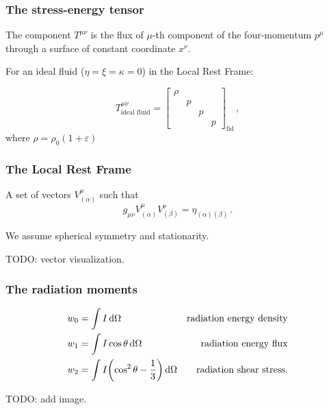 \documentclass{beamer}
\begin{document}
\begin{frame}
    \frametitle{The stress-energy tensor}

    The component \(T^{\mu\nu}\) is the flux of \(\mu\)-th component of the four-momentum \(p^\mu\) through a surface of constant coordinate \(x^\nu\).

    For an ideal fluid (\(\eta = \xi = \kappa = 0\)) in the Local Rest Frame:

    \begin{equation*}
        T^{\mu\nu}_{\text{ideal fluid}} =
        \begin{bmatrix}
        \rho   &   &   &  \\
           & p  &   &  \\
           &   & p  &  \\
           &   &   & p
       \end{bmatrix}_{\text{fid}} \,,
    \end{equation*}
    where \(\rho = \rho_0 (1 + \varepsilon)\)
\end{frame}

\begin{frame}
    \frametitle{The Local Rest Frame}

    A set of vectors \(V^\mu _{(\alpha)}\)  such that
    \begin{equation*}
        g_{\mu\nu} V^\mu _{(\alpha)} V^\nu _{(\beta)} = \eta_{(\alpha) (\beta)}\,.
    \end{equation*}

    We assume spherical symmetry and stationarity.

    TODO: vector visualization.
\end{frame}

\begin{frame}
    \frametitle{The radiation moments}

    \begin{subequations}
    \begin{align*}
      w_0 &= \int I \dd{\Omega} & \text{radiation energy density} \\
      w_1 &= \int I \cos \theta \dd{\Omega} & \text{radiation energy flux} \\
      w_2 &= \int I \qty(\cos^2 \theta - \frac{1}{3}) \dd{\Omega} & \text{radiation shear stress.}
    \end{align*}
    \end{subequations}

    TODO: add image.
\end{frame}
\end{document}
